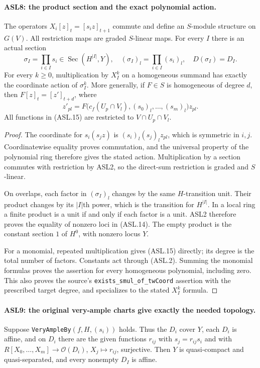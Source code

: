 \paragraph{ASL8: the product section and the exact polynomial action.}
\label{claim:ASL8}
The operators $X_i[z]_t=[s_i z]_{t+1}$ commute and define an
$S$-module structure on $G(V)$.  All restriction maps are graded
$S$-linear maps.  For every $I$ there is an actual section
\[
 \sigma_I=\prod_{i\in I}s_i\in\operatorname{Sec}(H^{|I|},Y),
 \quad (\sigma_I)_l=\prod_{i\in I}(s_i)_l,
 \quad D(\sigma_I)=D_I.                              \tag{ASL.14}
\]
For every $k\ge0$, multiplication by $X_I^k$ on a homogeneous
summand has exactly the coordinate action of $\sigma_I^k$.
More generally, if $F\in S$ is homogeneous of degree $d$, then
$F[z]_t=[z']_{t+d}$, where
\[
 z'_{pl}=F\bigl(c_f(U_p\cap V_l),
                      (s_0)_l,\ldots,(s_m)_l\bigr)z_{pl}.
                                                        \tag{ASL.15}
\]
All functions in (ASL.15) are restricted to $V\cap U_p\cap V_l$.

\begin{proof}
The coordinate for $s_i(s_jz)$ is
$(s_i)_l(s_j)_lz_{pl}$, which is symmetric in $i,j$.
Coordinatewise equality proves commutation, and the universal property
of the polynomial ring therefore gives the stated action.
Multiplication by a section commutes with restriction by ASL2,
so the direct-sum restriction is graded and $S$-linear.

On overlaps, each factor in $(\sigma_I)_l$ changes by the same
$H$-transition unit.  Their product changes by its $|I|$th power,
which is the transition for $H^{|I|}$.  In a local ring a finite
product is a unit if and only if each factor is a unit.  ASL2
therefore proves the equality of nonzero loci in (ASL.14).
The empty product is the constant section $1$ of $H^0$, with
nonzero locus $Y$.

For a monomial, repeated multiplication gives (ASL.15) directly;
its degree is the total number of factors.  Constants act through
(ASL.2).  Summing the monomial formulas proves the assertion for
every homogeneous polynomial, including zero.  This also proves
the source's \texttt{exists\_\allowbreak{}smul\_\allowbreak{}of\_\allowbreak{}tw\allowbreak{}Coord} assertion with
the prescribed target degree, and specializes to the stated
$X_I^k$ formula.
\end{proof}

\paragraph{ASL9: the original very-ample charts give exactly the needed topology.}
\label{claim:ASL9}
Suppose \texttt{Very\allowbreak{}Ample\allowbreak{}By}$(f,H,(s_i))$ holds.  Thus the
$D_i$ cover $Y$, each $D_i$ is affine, and on $D_i$ there are
the given functions $r_{ij}$ with $s_j=r_{ij}s_i$ and with
$R[X_0,\ldots,X_m]\to\mathcal O(D_i)$, $X_j\mapsto r_{ij}$,
surjective.  Then $Y$ is quasi-compact and quasi-separated,
and every nonempty $D_I$ is affine.

